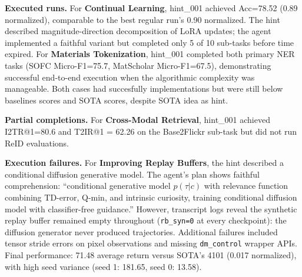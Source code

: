 \documentclass[11pt]{article}
\let\oldtexttt\texttt
\renewcommand{\texttt}[1]{{\fontseries{m}\selectfont\oldtexttt{#1}}}
\theoremstyle{plain}
\theoremstyle{definition}
\theoremstyle{remark}
\begin{document}
\textbf{Executed runs.} For \textbf{Continual Learning}, hint\_001 achieved Acc=78.52 (0.89 normalized), comparable to the best regular run's 0.90 normalized. The hint described magnitude-direction decomposition of LoRA updates; the agent implemented a faithful variant but completed only 5 of 10 sub-tasks before time expired. For \textbf{Materials Tokenization}, hint\_001 completed both primary NER tasks (SOFC Micro-F1=75.7, MatScholar Micro-F1=67.5), demonstrating successful end-to-end execution when the algorithmic complexity was manageable. Both cases had succesfully implementations but were still below baselines scores and SOTA scores, despite SOTA idea as hint.

\textbf{Partial completions.} For \textbf{Cross-Modal Retrieval}, hint\_001 achieved I2TR@1=80.6 and T2IR@1 = 62.26 on the Base2Flickr sub-task but did not run ReID evaluations. 

\textbf{Execution failures.} For \textbf{Improving Replay Buffers}, the hint described a conditional diffusion generative model. The agent's plan shows faithful comprehension: ``conditional generative model $p(\tau|c)$ with relevance function combining TD-error, Q-min, and intrinsic curiosity, training conditional diffusion model with classifier-free guidance.'' However, transcript logs reveal the synthetic replay buffer remained empty throughout (\texttt{rb\_syn=0} at every checkpoint): the diffusion generator never produced trajectories. Additional failures included tensor stride errors on pixel observations and missing \texttt{dm\_control} wrapper APIs. Final performance: 71.48 average return versus SOTA's 4101 (0.017 normalized), with high seed variance (seed 1: 181.65, seed 0: 13.58).
\end{document}
